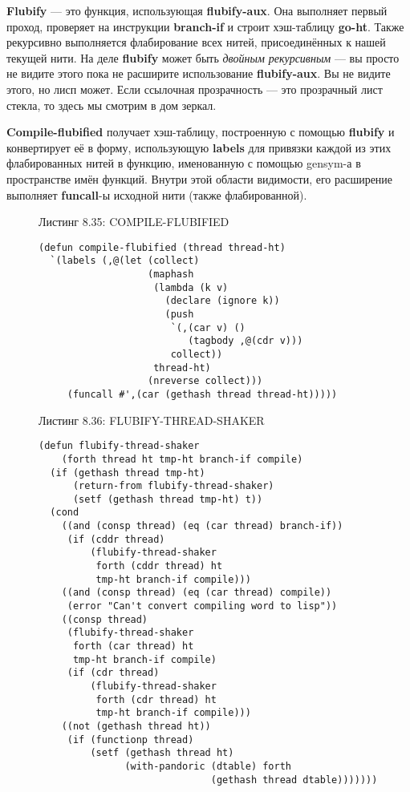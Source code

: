 \textbf{Flubify} --- это функция, использующая \textbf{flubify-aux}. Она выполняет первый проход, проверяет на инструкции \textbf{branch-if} и строит хэш-таблицу \textbf{go-ht}. Также рекурсивно выполняется флабирование всех нитей, присоединённых к нашей текущей нити. На деле \textbf{flubify} может быть \emph{двойным рекурсивным} --- вы просто не видите этого пока не расширите использование \textbf{flubify-aux}. Вы не видите этого, но лисп может. Если ссылочная прозрачность --- это прозрачный лист стекла, то здесь мы смотрим в дом зеркал.

\textbf{Compile-flubified} получает хэш-таблицу, построенную с помощью \textbf{flubify} и конвертирует её в форму, использующую \textbf{labels} для привязки каждой из этих флабированных нитей в функцию, именованную с помощью gensym-а в пространстве имён функций. Внутри этой области видимости, его расширение выполняет \textbf{funcall}-ы исходной нити (также флабированной).

\begin{figure}Листинг 8.35: COMPILE-FLUBIFIED\label{listing_8.35}
\listbegin
\begin{verbatim}
(defun compile-flubified (thread thread-ht)
  `(labels (,@(let (collect)
                   (maphash
                    (lambda (k v)
                      (declare (ignore k))
                      (push
                       `(,(car v) ()
                          (tagbody ,@(cdr v)))
                       collect))
                    thread-ht)
                   (nreverse collect)))
     (funcall #',(car (gethash thread thread-ht)))))
\end{verbatim}
\listend
\end{figure}

\begin{figure}Листинг 8.36: FLUBIFY-THREAD-SHAKER\label{listing_8.36}
\listbegin
\begin{verbatim}
(defun flubify-thread-shaker
    (forth thread ht tmp-ht branch-if compile)
  (if (gethash thread tmp-ht)
      (return-from flubify-thread-shaker)
      (setf (gethash thread tmp-ht) t))
  (cond
    ((and (consp thread) (eq (car thread) branch-if))
     (if (cddr thread)
         (flubify-thread-shaker
          forth (cddr thread) ht
          tmp-ht branch-if compile)))
    ((and (consp thread) (eq (car thread) compile))
     (error "Can't convert compiling word to lisp"))
    ((consp thread)
     (flubify-thread-shaker
      forth (car thread) ht
      tmp-ht branch-if compile)
     (if (cdr thread)
         (flubify-thread-shaker
          forth (cdr thread) ht
          tmp-ht branch-if compile)))
    ((not (gethash thread ht))
     (if (functionp thread)
         (setf (gethash thread ht)
               (with-pandoric (dtable) forth
                              (gethash thread dtable)))))))
\end{verbatim}
\listend
\end{figure}

